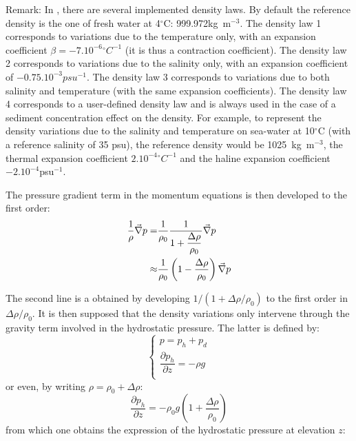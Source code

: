 \begin{CommentBlock}{Remark:}
In , there are several implemented density laws. By default the reference density
is the one of fresh water at 4$^\circ$C: 999.972kg~m$^{-3}$. The density law 1
corresponds to variations due to the temperature only, with an expansion coefficient
$\beta=-7.10^{-6}{}^\circ C^{-1}$  (it is thus a contraction coefficient).
The density law 2 corresponds to variations due to the
salinity only, with an expansion coefficient of $-0.75.10^{-3}psu^{-1}$.
The density law 3 corresponds to variations due to both salinity and temperature (with the
same expansion coefficients). The density law 4 corresponds to a user-defined
density law and is always used in the case of a sediment concentration effect on the density.
For example, to represent the density variations due to the salinity and temperature on
sea-water at 10$^\circ$C (with a reference salinity of 35 psu),
the reference density would be \mbox{1025 kg m$^{-3}$}, the thermal expansion coefficient
$2.10^{-4}{}^\circ C^{-1}$ and the haline expansion coefficient $-2.10^{-4}$psu$^{-1}$.
\end{CommentBlock}

The pressure gradient term in the momentum equations is then
developed to the first order:%
%
\begin{align}
  \dfrac{1}{\rho}\vec \nabla p  = & \dfrac{1}{\rho_0}\dfrac{1}{1+\dfrac{\Delta\rho}{\rho_0}}\vec \nabla p
  \notag \\
  \approx & \dfrac{1}{\rho_0}\left(1-\dfrac{\Delta\rho}{\rho_0}\right)\vec \nabla p
  \label{eq:grad_pres}
\end{align}

The second line is a obtained by developing $1/(1+\Delta\rho/\rho_0)$ to the first order in $\Delta\rho/\rho_0$.
It is then supposed that the density variations only intervene through the gravity term involved in the hydrostatic pressure.
The latter is defined by:
\begin{equation}
  \left\{
    \begin{array}{l}
      p = p_h + p_d \\
      \dfrac{\partial p_h}{\partial z}=-\rho g \\
    \end{array}
  \right.
\end{equation}
or even, by writing $\rho=\rho_{0}+\Delta\rho$:%
\begin{equation}
\dfrac{\partial p_h}{\partial z}=-\rho_{0}g\left(  1+\dfrac{\Delta\rho}{\rho_{0}%
}\right)
\end{equation}
from which one obtains the expression of the hydrostatic pressure at elevation $z$:%

